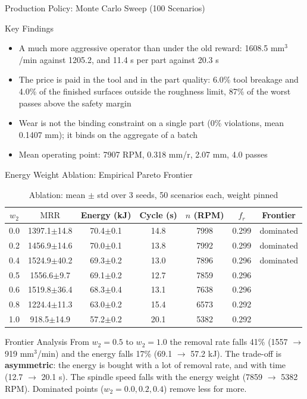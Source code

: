 \documentclass[11pt,aspectratio=169]{beamer}
\newcommand{\MRR}{\mathrm{MRR}}
\newcommand{\CMark}{\ding{51}}
\begin{document}
\begin{frame}{Production Policy: Monte Carlo Sweep (100 Scenarios)}
    \vspace{0em}
    \begin{block}{Key Findings}
    \scriptsize
    \begin{itemize}
        \item A much more aggressive operator than under the old reward: 1608.5 mm$^3$/min against 1205.2, and 11.4 s per part against 20.3 s
        \item The price is paid in the tool and in the part quality: \alert{6.0\% tool breakage} and 4.0\% of the finished surfaces outside the roughness limit, 87\% of the worst passes above the safety margin
        \item Wear is not the binding constraint on a single part (0\% violations, mean 0.1407 mm); it binds on the aggregate of a batch
        \item Mean operating point: 7907 RPM, 0.318 mm/r, 2.07 mm, 4.0 passes
    \end{itemize}
    \end{block}
\end{frame}
\begin{frame}{Energy Weight Ablation: Empirical Pareto Frontier}
    \small
    \begin{table}
    \centering
    \scriptsize
    \caption{Ablation: mean $\pm$ std over 3 seeds, 50 scenarios each, weight pinned}
    \begin{tabular}{@{}ccccccc@{}}
    \toprule
    $w_2$ & $\MRR$ & Energy (kJ) & Cycle (s) & $n$ (RPM) & $f_r$ & Frontier \\
    \midrule
    0.0 & 1397.1$\pm$14.8 & 70.4$\pm$0.1 & 14.8 & 7998 & 0.299 & dominated \\
    0.2 & 1456.9$\pm$14.6 & 70.0$\pm$0.1 & 13.8 & 7992 & 0.299 & dominated \\
    0.4 & 1524.9$\pm$40.2 & 69.3$\pm$0.2 & 13.0 & 7896 & 0.296 & dominated \\
    0.5 & 1556.6$\pm$9.7 & 69.1$\pm$0.2 & 12.7 & 7859 & 0.296 & \CMark \\
    0.6 & 1519.8$\pm$36.4 & 68.3$\pm$0.4 & 13.1 & 7638 & 0.296 & \CMark \\
    0.8 & 1224.4$\pm$11.3 & 63.0$\pm$0.2 & 15.4 & 6573 & 0.292 & \CMark \\
    1.0 & 918.5$\pm$14.9 & 57.2$\pm$0.2 & 20.1 & 5382 & 0.292 & \CMark \\
    \bottomrule
    \end{tabular}
    \end{table}

    \vspace{0.4em}
    \begin{alertblock}{Frontier Analysis}
    From $w_2 = 0.5$ to $w_2 = 1.0$ the removal rate falls \alert{41\%} (1557 $\to$ 919 mm$^3$/min)
    and the energy falls \alert{17\%} (69.1 $\to$ 57.2 kJ). The trade-off is \textbf{asymmetric}: the
    energy is bought with a lot of removal rate, and with time (12.7 $\to$ 20.1 s). The spindle speed
    falls with the energy weight (7859 $\to$ 5382 RPM). Dominated points ($w_2 = 0.0, 0.2, 0.4$) remove
    less for more.
    \end{alertblock}
\end{frame}
\end{document}
